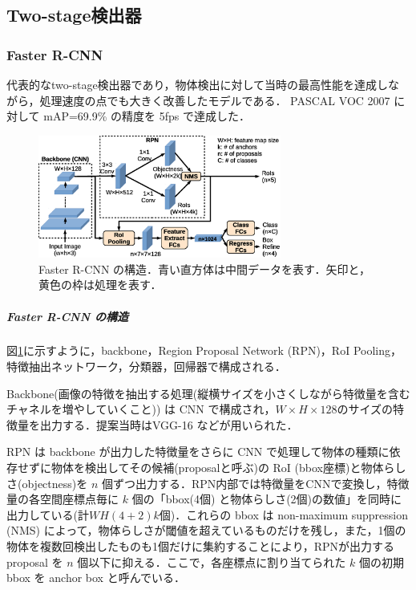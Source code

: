 \documentclass[twocolumn]{jsarticle} %
\begin{document}
\subsection{Two-stage検出器}
\subsubsection{Faster R-CNN \cite{RHGS15}}
代表的なtwo-stage検出器であり，物体検出に対して当時の最高性能を達成しながら，処理速度の点でも大きく改善したモデルである．
PASCAL VOC 2007 に対して mAP=69.9\% の精度を 5fps で達成した．
\begin{figure}[tb]
    \begin{center}
        \includegraphics[width=8cm,clip]{fig/archi_FasterRCNN.eps}
    \end{center}
    \caption{ Faster R-CNN の構造．青い直方体は中間データを表す．矢印と，黄色の枠は処理を表す．}
    \label{fig:archi_FasterRCNN}
\end{figure}

\subparagraph{Faster R-CNN の構造} 図\ref{fig:archi_FasterRCNN}に示すように，backbone，Region Proposal Network (RPN)，RoI Pooling，特徴抽出ネットワーク，分類器，回帰器で構成される．

Backbone(画像の特徴を抽出する処理(縦横サイズを小さくしながら特徴量を含むチャネルを増やしていくこと)) は CNN で構成され，$W{\times}H{\times}128$のサイズの特徴量を出力する．提案当時はVGG-16 \cite{SimZis15}などが用いられた．

RPN は backbone が出力した特徴量をさらに CNN で処理して物体の種類に依存せずに物体を検出してその候補(proposalと呼ぶ)の RoI (bbox座標)と物体らしさ(objectness)を $n$ 個ずつ出力する．RPN内部では特徴量をCNNで変換し，特徴量の各空間座標点毎に $k$ 個の「bbox(4個) と物体らしさ(2個)の数値」を同時に出力している(計$WH(4{+}2)k$個)．これらの bbox は non-maximum suppression (NMS) によって，物体らしさが閾値を超えているものだけを残し，また，1個の物体を複数回検出したものも1個だけに集約することにより，RPNが出力するproposal を $n$ 個以下に抑える．ここで，各座標点に割り当てられた $k$ 個の初期 bbox を anchor box と呼んでいる．
\end{document}
